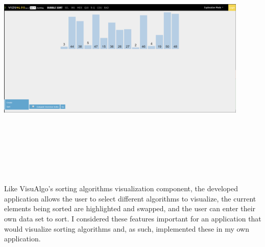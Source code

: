 \begin{center}
    \includegraphics[width=12cm,height=12cm,keepaspectratio]{images/visalgosorting}
\end{center}
\newpage
Like VisuAlgo's sorting algorithms visualization component, the developed application allows the user to select different algorithms to visualize, the current elements being sorted are highlighted and swapped, and the user can enter their own data set to sort. I considered these features important for an application that would visualize sorting algorithms and, as such, implemented these in my own application.
\par
\bigskip
